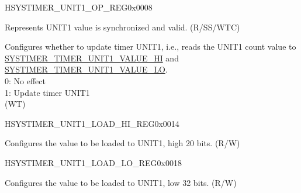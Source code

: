 \begin{register}{H}{SYSTIMER\_UNIT1\_OP\_REG}{0x0008}\label{regdesc:SYSTIMERUNIT1OPREG}
%
%
%
%
\regnewline%
\begin{regdesc}\begin{reglist}
\label{fielddesc:SYSTIMERTIMERUNIT1VALUEVALID}\item [SYSTIMER\_TIMER\_UNIT1\_VALUE\_VALID] Represents UNIT1 value is synchronized and valid. (R/SS/WTC)
\label{fielddesc:SYSTIMERTIMERUNIT1UPDATE}\item [SYSTIMER\_TIMER\_UNIT1\_UPDATE] Configures whether to update timer UNIT1, i.e., reads the UNIT1 count value to \hyperref[fielddesc:SYSTIMERTIMERUNIT0VALUEHI]{SYSTIMER\_TIMER\_UNIT1\_VALUE\_HI} and \hyperref[fielddesc:SYSTIMERTIMERUNIT0VALUELO]{SYSTIMER\_TIMER\_UNIT1\_VALUE\_LO}. \\
0: No effect \\
1: Update timer UNIT1\\
(WT)
\end{reglist}\end{regdesc}
\end{register}


\begin{register}{H}{SYSTIMER\_UNIT1\_LOAD\_HI\_REG}{0x0014}\label{regdesc:SYSTIMERUNIT1LOADHIREG}
%
%
\regnewline%
\begin{regdesc}\begin{reglist}
\label{fielddesc:SYSTIMERTIMERUNIT1LOADHI}\item [SYSTIMER\_TIMER\_UNIT1\_LOAD\_HI] Configures the value to be loaded to UNIT1, high 20 bits. (R/W)
\end{reglist}\end{regdesc}
\end{register}


\begin{register}{H}{SYSTIMER\_UNIT1\_LOAD\_LO\_REG}{0x0018}\label{regdesc:SYSTIMERUNIT1LOADLOREG}
%
\regnewline%
\begin{regdesc}\begin{reglist}
\label{fielddesc:SYSTIMERTIMERUNIT1LOADLO}\item [SYSTIMER\_TIMER\_UNIT1\_LOAD\_LO] Configures the value to be loaded to UNIT1, low 32 bits. (R/W)
\end{reglist}\end{regdesc}
\end{register}


